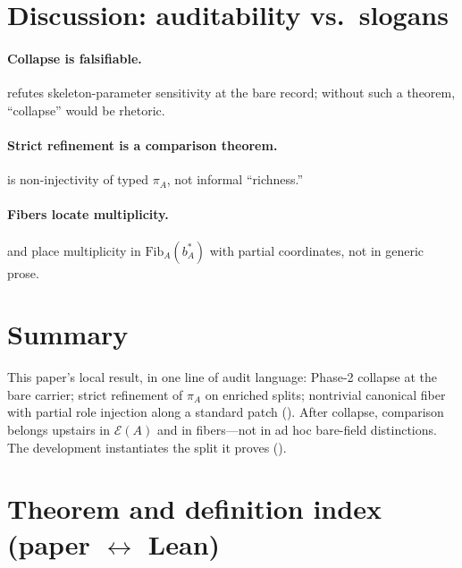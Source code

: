 \documentclass[11pt]{article}
\begin{document}
\section{Discussion: auditability vs.\ slogans}\label{sec:discussion-law}

\paragraph{Collapse is falsifiable.}
 refutes skeleton-parameter sensitivity at the bare record; without such a theorem, ``collapse'' would be rhetoric.

\paragraph{Strict refinement is a comparison theorem.}
 is non-injectivity of typed $\pi_A$, not informal ``richness.''

\paragraph{Fibers locate multiplicity.}
 and  place multiplicity in $\mathrm{Fib}_A(b^\ast_A)$ with partial coordinates, not in generic prose.

\section{Summary}\label{sec:summary}
This paper's local result, in one line of audit language: Phase-2 collapse at the bare carrier; strict refinement of $\pi_A$ on enriched splits; nontrivial canonical fiber with partial role injection along a standard patch (). After collapse, comparison belongs upstairs in $\mathcal{E}(A)$ and in fibers---not in ad hoc bare-field distinctions. The development instantiates the split it proves ().

\appendix

\section[Theorem index (paper and Lean)]{Theorem and definition index (paper \texorpdfstring{$\leftrightarrow$}{<->} Lean)}\label{app:theorem-index}
\end{document}
